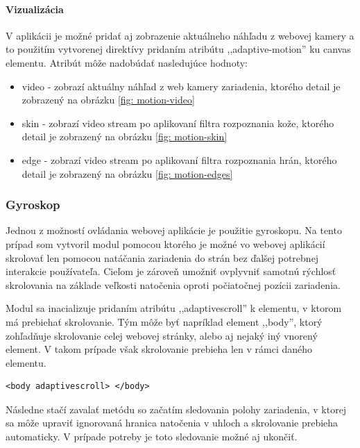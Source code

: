\paragraph{Vizualizácia} %
\label{par:zobrazenie_n_h_adu}

V aplikácii je možné pridať aj zobrazenie aktuálneho náhľadu z webovej kamery a to použitím vytvorenej direktívy pridaním atribútu ,,adaptive-motion'' ku canvas elementu. Atribút môže nadobúdať nasledujúce hodnoty:

\begin{itemize}
  \item video - zobrazí aktuálny náhľad z web kamery zariadenia, ktorého detail je zobrazený na obrázku \ref{fig: motion-video}
  \item skin - zobrazí video stream po aplikovaní filtra rozpoznania kože, ktorého detail je zobrazený na obrázku \ref{fig: motion-skin}
  \item edge - zobrazí video stream po aplikovaní filtra rozpoznania hrán, ktorého detail je zobrazený na obrázku \ref{fig: motion-edges}
\end{itemize}




\subsubsection{Gyroskop} %
\label{ssub:gyroskop}

Jednou z možností ovládania webovej aplikácie je použitie gyroskopu. Na tento prípad som vytvoril modul pomocou ktorého je možné vo webovej aplikácií skrolovať len pomocou natáčania zariadenia do strán bez ďalšej potrebnej interakcie používateľa. Cieľom je zároveň umožniť ovplyvniť samotnú rýchlosť skrolovania na základe veľkosti natočenia oproti počiatočnej pozícii zariadenia.

Modul sa inacializuje pridaním atribútu ,,adaptivescroll'' k elementu, v ktorom má prebiehať skrolovanie. Tým môže byť napríklad element ,,body'', ktorý zohľadňuje skrolovanie celej webovej stránky, alebo aj nejaký iný vnorený element. V takom prípade však skrolovanie prebieha len v rámci daného elementu.

\begin{lstlisting}
<body adaptivescroll> </body>
\end{lstlisting}

Následne stačí zavalať metódu so začatím sledovania polohy zariadenia, v ktorej sa môže upraviť ignorovaná hranica natočenia v uhloch a skrolovanie prebieha automaticky. V prípade potreby je toto sledovanie možné aj ukončiť.

